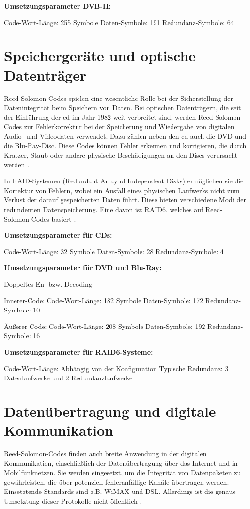 \textbf{Umsetzungsparameter DVB-H:}

Code-Wort-Länge: 255 Symbole
Daten-Symbole: 191
Redundanz-Symbole: 64

\section{Speichergeräte und optische Datenträger}

Reed-Solomon-Codes spielen eine wesentliche Rolle bei der Sicherstellung der Datenintegrität beim Speichern von Daten. 
Bei optischen Datenträgern, die seit der Einführung der \acrfull{cd} im Jahr 1982 weit verbreitet sind, werden Reed-Solomon-Codes zur Fehlerkorrektur bei der Speicherung und Wiedergabe von digitalen Audio- und Videodaten verwendet. Dazu zählen neben den \acrshort{cd} auch die DVD und die Blu-Ray-Disc. 
Diese Codes können Fehler erkennen und korrigieren, die durch Kratzer, Staub oder andere physische Beschädigungen an den Discs verursacht werden \cite{changReedSolomonProductCodeRSPC1998}. 

In RAID-Systemen (Redundant Array of Independent Disks) ermöglichen sie die Korrektur von Fehlern, wobei ein Ausfall eines physischen Laufwerks nicht zum Verlust der darauf gespeicherten Daten führt.
Diese bieten verschiedene Modi der redundenten Datenspeicherung.
Eine davon ist RAID6, welches auf Reed-Solomon-Codes basiert \cite{RAIDStorageTechnology2021}.

\textbf{Umsetzungsparameter für CDs:}

Code-Wort-Länge: 32 Symbole
Daten-Symbole: 28
Redundanz-Symbole: 4

\textbf{Umsetzungsparameter für DVD und Blu-Ray:}

Doppeltes En- bzw. Decoding

Innerer-Code:
Code-Wort-Länge: 182 Symbole
Daten-Symbole: 172
Redundanz-Symbole: 10

Äußerer Code:
Code-Wort-Länge: 208 Symbole
Daten-Symbole: 192
Redundanz-Symbole: 16

\textbf{Umsetzungsparameter für RAID6-Systeme:}

Code-Wort-Länge: Abhängig von der Konfiguration
Typische Redundanz: 3 Datenlaufwerke und 2 Redundanzlaufwerke

\section{Datenübertragung und digitale Kommunikation}

Reed-Solomon-Codes finden auch breite Anwendung in der digitalen Kommunikation, einschließlich der Datenübertragung über das Internet und in Mobilfunknetzen. 
Sie werden eingesetzt, um die Integrität von Datenpaketen zu gewährleisten, die über potenziell fehleranfällige Kanäle übertragen werden. 
Einsetztende Standards sind z.B. WiMAX und DSL.
Allerdings ist die genaue Umsetztung dieser Protokolle nicht öffentlich \cite{vermillionEndtoendDSLArchitectures2003}.

